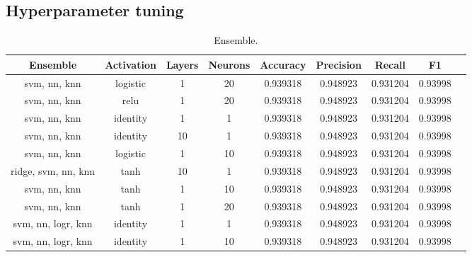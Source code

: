 

\begin{appendices}

\section{Hyperparameter tuning}
\label{appendix:Hyperparameters}


\begin{table}[!h]
\hskip-3.0cm\begin{tabular*}{1.5\textwidth}{c @{\extracolsep{\fill}} cccccccc}

\toprule
Ensemble     & Activation & Layers        &  Neurons &  Accuracy &  Precision &    Recall &  F1 \\
\midrule
svm, nn, knn &   logistic & 1             &       20 &  0.939318 &   0.948923 &  0.931204 &  0.93998 \\
svm, nn, knn &       relu & 1             &       20 &  0.939318 &   0.948923 &  0.931204 &  0.93998 \\
svm, nn, knn &   identity & 1             &        1 &  0.939318 &   0.948923 &  0.931204 &  0.93998 \\
svm, nn, knn &   identity & 10            &        1 &  0.939318 &   0.948923 &  0.931204 &  0.93998 \\
svm, nn, knn &   logistic & 1             &       10 &  0.939318 &   0.948923 &  0.931204 &  0.93998 \\
ridge, svm, nn, knn & tanh & 10           &        1 &  0.939318 &   0.948923 &  0.931204 &  0.93998 \\
svm, nn, knn &       tanh & 1             &       10 &  0.939318 &   0.948923 &  0.931204 &  0.93998 \\
svm, nn, knn &       tanh & 1             &       20 &  0.939318 &   0.948923 &  0.931204 &  0.93998 \\
svm, nn, logr, knn & identity & 1         &        1 &  0.939318 &   0.948923 &  0.931204 &  0.93998 \\
svm, nn, logr, knn & identity & 1         &       10 &  0.939318 &   0.948923 &  0.931204 &  0.93998 \\
\bottomrule

\end{tabular*}
\caption{\label{tab:Ensemble}Ensemble.}
\end{table}



\end{appendices}
